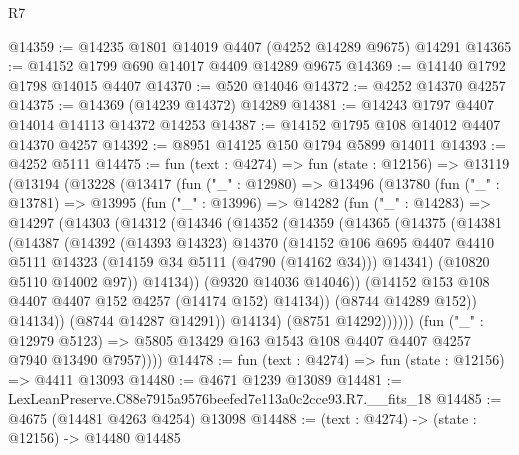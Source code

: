 \begin{lexlean}{R7}
\begin{coremodule}
@14359 := @14235 @1801 @14019 @4407 (@4252 @14289 @9675) @14291
@14365 := @14152 @1799 @690 @14017 @4409 @14289 @9675
@14369 := @14140 @1792 @1798 @14015 @4407
@14370 := @520 @14046
@14372 := @4252 @14370 @4257
@14375 := @14369 (@14239 @14372) @14289
@14381 := @14243 @1797 @4407 @14014 @14113 @14372 @14253
@14387 := @14152 @1795 @108 @14012 @4407 @14370 @4257
@14392 := @8951 @14125 @150 @1794 @5899 @14011
@14393 := @4252 @5111
@14475 := fun (text : @4274) =>
  fun (state : @12156) =>
  @13119
    (@13194
      (@13228
        (@13417
          (fun ("_" : @12980) =>
          @13496
            (@13780
              (fun ("_" : @13781) =>
              @13995
                (fun ("_" : @13996) =>
                @14282
                  (fun ("_" : @14283) =>
                  @14297
                    (@14303
                      (@14312
                        (@14346
                          (@14352
                            (@14359
                              (@14365
                                (@14375
                                  (@14381
                                    (@14387
                                      (@14392
                                        (@14393 @14323)
                                        @14370
                                        (@14152
                                          @106
                                          @695
                                          @4407
                                          @4410
                                          @5111
                                          @14323
                                          (@14159 @34 @5111 (@4790 (@14162 @34)))
                                          @14341)
                                        (@10820 @5110 @14002 @97))
                                      @14134))
                                  (@9320 @14036 @14046))
                                (@14152 @153 @108 @4407 @4407 @152 @4257 (@14174 @152) @14134))
                              (@8744 @14289 @152))
                            @14134))
                        (@8744 @14287 @14291))
                      @14134)
                    (@8751 @14292))))))
          (fun ("_" : @12979 @5123) =>
          @5805 @13429 @163 @1543 @108 @4407 @4407 @4257 @7940 @13490 @7957))))
@14478 := fun (text : @4274) => fun (state : @12156) => @4411 @13093
@14480 := @4671 @1239 @13089
@14481 := LexLeanPreserve.C88e7915a9576beefed7e113a0c2cce93.R7.__fits_18
@14485 := @4675 (@14481 @4263 @4254) @13098
@14488 := (text : @4274) -> (state : @12156) -> @14480 @14485

\end{coremodule}
\end{lexlean}
